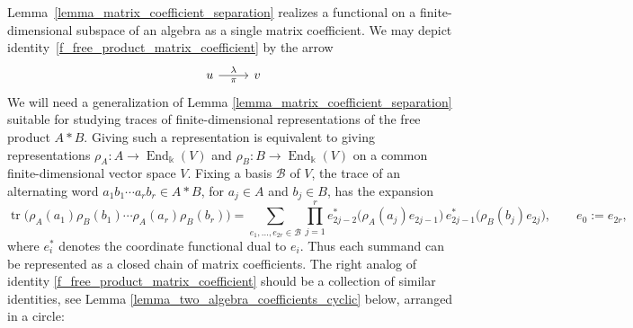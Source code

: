Lemma~\ref{lemma_matrix_coefficient_separation} realizes a functional on a finite-dimensional subspace of an algebra as a single matrix coefficient. We may depict identity~\eqref{f_free_product_matrix_coefficient} by the arrow
\[
    \begin{tikzcd}
        u \arrow[r, "\lambda", "\pi"'] & v
    \end{tikzcd}
\]
We will need a generalization of Lemma \ref{lemma_matrix_coefficient_separation} suitable for studying traces of finite-dimensional representations of the free product \(A*B\). Giving such a representation is equivalent to giving representations \(\rho_A\colon A\to\operatorname{End}_{\Bbbk}(V)\) and \(\rho_B\colon B\to\operatorname{End}_{\Bbbk}(V)\) on a common finite-dimensional vector space \(V\). Fixing a basis \(\mathcal{B}\) of \(V\), the trace of an alternating word \(a_1b_1\cdots a_rb_r\in A*B\), for \(a_j\in A\) and \(b_j\in B\), has the expansion
\[
    \operatorname{tr}\bigl(\rho_A(a_1)\rho_B(b_1)\cdots\rho_A(a_r)\rho_B(b_r)\bigr)
    =\sum_{e_1,\ldots,e_{2r}\in\mathcal{B}}
    \prod_{j=1}^{r}
    e_{2j-2}^*\bigl(\rho_A(a_j)e_{2j-1}\bigr)\,
    e_{2j-1}^*\bigl(\rho_B(b_j)e_{2j}\bigr),
    \qquad e_0:=e_{2r},
\]
where \(e_i^*\) denotes the coordinate functional dual to \(e_i\). Thus each summand can be represented as a closed chain of matrix coefficients. The right analog of identity \eqref{f_free_product_matrix_coefficient} should be a collection of similar identities, see Lemma \ref{lemma_two_algebra_coefficients_cyclic} below, arranged in a circle:
